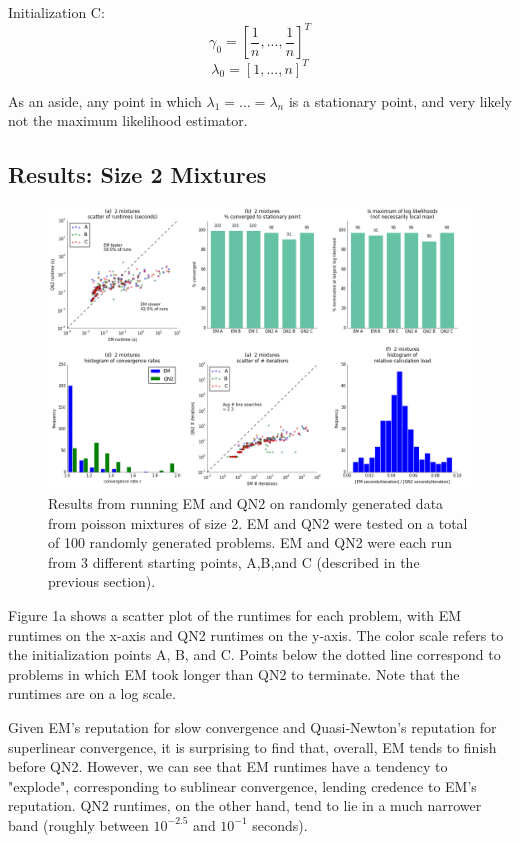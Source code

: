 \documentclass[letter,12pt]{article}
\begin{document}
Initialization C:
\[
\gamma_0 = [\frac{1}{n},...,\frac{1}{n}]^T
\]
\[
\lambda_0 = [1,...,n]^T
\]

As an aside, any point in which $\lambda_1 = \dots = \lambda_n$ is a stationary point, and very likely not the maximum likelihood estimator.

\pagebreak
\subsection{Results: Size 2 Mixtures}

\begin{figure}[h]
\centering
\includegraphics[width=16cm]{fig_RunData2_K2_init3.png}
\caption{Results from running EM and QN2 on randomly generated data from poisson mixtures of size 2.  EM and QN2 were tested on a total of 100 randomly generated problems.  EM and QN2 were each run from 3 different starting points, A,B,and C (described in the previous section).}
\end{figure}

Figure 1a shows a scatter plot of the runtimes for each problem, with EM runtimes on the x-axis and QN2 runtimes on the y-axis.  The color scale refers to the initialization points A, B, and C.  Points below the dotted line correspond to problems in which EM took longer than QN2 to terminate.  Note that the runtimes are on a log scale.  

Given EM's reputation for slow convergence and Quasi-Newton's reputation for superlinear convergence, it is surprising to find that, overall, EM tends to finish before QN2.  However, we can see that EM runtimes have a tendency to "explode", corresponding to sublinear convergence, lending credence to EM's reputation.  QN2 runtimes, on the other hand, tend to lie in a much narrower band (roughly between $10^{-2.5}$ and $10^{-1}$ seconds).
\end{document}

